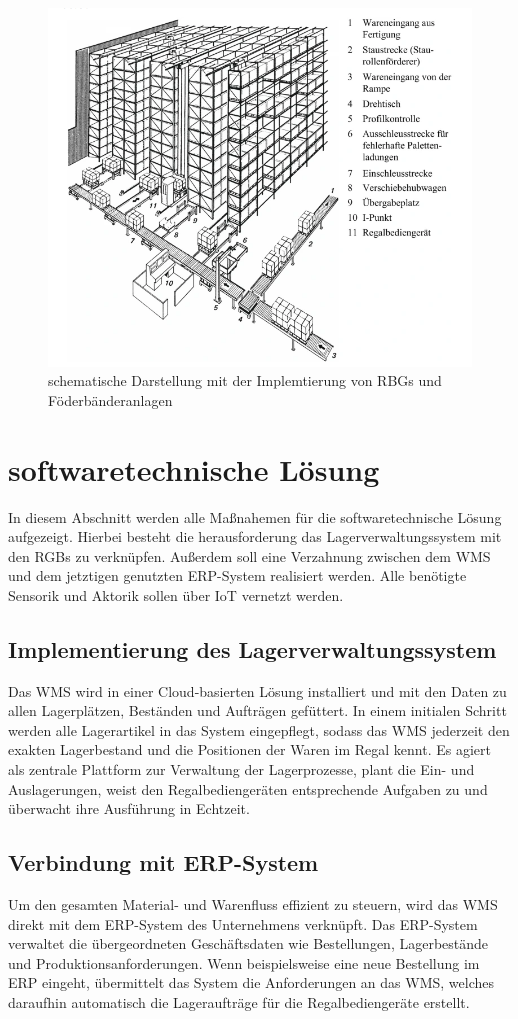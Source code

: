 \begin{figure}
	\centering
	\includegraphics[width=0.7\linewidth]{images/skizze-Aufbau}
	\caption{schematische Darstellung mit der Implemtierung von RBGs und Föderbänderanlagen}
	\label{fig:skizze-aufbau}
\end{figure}

\section{softwaretechnische Lösung}
In diesem Abschnitt werden alle Maßnahemen für die softwaretechnische Lösung aufgezeigt. Hierbei besteht die herausforderung das Lagerverwaltungssystem mit den RGBs zu verknüpfen. Außerdem soll eine Verzahnung zwischen dem WMS und dem jetztigen genutzten ERP-System realisiert werden. Alle benötigte Sensorik und Aktorik sollen über IoT vernetzt werden.
\subsection{Implementierung des Lagerverwaltungssystem}
Das WMS wird in einer Cloud-basierten Lösung installiert und mit den Daten zu allen Lagerplätzen, Beständen und Aufträgen gefüttert. In einem initialen Schritt werden alle Lagerartikel in das System eingepflegt, sodass das WMS jederzeit den exakten Lagerbestand und die Positionen der Waren im Regal kennt. Es agiert als zentrale Plattform zur Verwaltung der Lagerprozesse, plant die Ein- und Auslagerungen, weist den Regalbediengeräten entsprechende Aufgaben zu und überwacht ihre Ausführung in Echtzeit.

\subsection{Verbindung mit ERP-System}
Um den gesamten Material- und Warenfluss effizient zu steuern, wird das WMS direkt mit dem ERP-System des Unternehmens verknüpft. Das ERP-System verwaltet die übergeordneten Geschäftsdaten wie Bestellungen, Lagerbestände und Produktionsanforderungen. Wenn beispielsweise eine neue Bestellung im ERP eingeht, übermittelt das System die Anforderungen an das WMS, welches daraufhin automatisch die Lageraufträge für die Regalbediengeräte erstellt.

